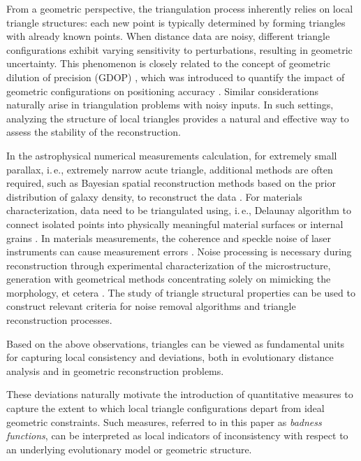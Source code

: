 \documentclass[11pt]{article}
\begin{document}
From a geometric perspective, the triangulation process inherently relies on local triangle structures: each new point is typically determined by forming triangles with already known points. When distance data are noisy, different triangle configurations exhibit varying sensitivity to perturbations, resulting in geometric uncertainty. This phenomenon is closely related to the concept of geometric dilution of precision (GDOP) \cite{WOS:001378163300002}, which was introduced to quantify the impact of geometric configurations on positioning accuracy \cite{WOS:001602214900001} \cite{WOS:001205843700001} \cite{WOS:001373834600021}. Similar considerations naturally arise in triangulation problems with noisy inputs. In such settings, analyzing the structure of local triangles provides a natural and effective way to assess the stability of the reconstruction.

In the astrophysical numerical measurements calculation, for extremely small parallax, i.\,e., extremely narrow acute triangle, additional methods are often required, such as Bayesian spatial reconstruction methods based on the prior distribution of galaxy density, to reconstruct the data \cite{bailer2018estimating}. For materials characterization, data need to be triangulated using, i.\,e., Delaunay algorithm to connect isolated points into physically meaningful material surfaces or internal grains \cite{gao2013delaunay}. In materials measurements, the coherence and speckle noise of laser instruments can cause measurement errors \cite{dorsch1994laser}. Noise processing is necessary during reconstruction through experimental characterization of the microstructure, generation with geometrical methods concentrating solely on mimicking the morphology, et cetera \cite{willems2012crystalline}. The study of triangle structural properties can be used to construct relevant criteria for noise removal algorithms and triangle reconstruction processes.

Based on the above observations, triangles can be viewed as fundamental units for capturing local consistency and deviations, both in evolutionary distance analysis and in geometric reconstruction problems.

These deviations naturally motivate the introduction of quantitative measures to capture the extent to which local triangle configurations depart from ideal geometric constraints. Such measures, referred to in this paper as \emph{badness functions}, can be interpreted as local indicators of inconsistency with respect to an underlying evolutionary model or geometric structure.
\end{document}
